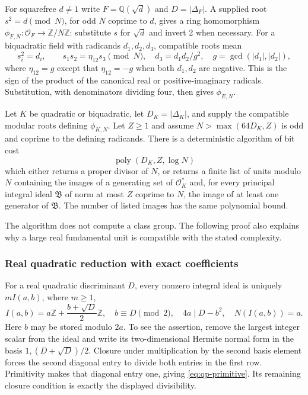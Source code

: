 For squarefree $d\ne1$ write $F=\mathbb Q(\sqrt d)$ and
$D=|\Delta_F|$.  A supplied root $s^2=d\pmod N$, for odd $N$ coprime to
$d$, gives a ring homomorphism
$\phi_{F,N}:\mathcal O_F\longrightarrow\mathbb Z/N\mathbb Z$:
substitute $s$ for $\sqrt d$ and invert 2 when necessary.  For a
biquadratic field with radicands $d_1,d_2,d_3$, compatible roots mean
\[
 s_i^2=d_i,\qquad s_1s_2=\eta_{12}s_3\pmod N,
 \quad d_3=d_1d_2/g^2,\quad g=\gcd(|d_1|,|d_2|),
\]
where $\eta_{12}=g$ except that $\eta_{12}=-g$ when both $d_1,d_2$ are
negative.  This is the sign of the product of the canonical real or
positive-imaginary radicals.  Substitution, with denominators dividing
four, then gives $\phi_{E,N}$.

\begin{theorem}
\label{thm:qp-enumeration}
Let $K$ be quadratic or biquadratic, let $D_K=|\Delta_K|$, and supply
the compatible modular roots defining $\phi_{K,N}$.  Let $Z\geq1$ and
assume $N>\max(64D_K,Z)$ is odd and coprime to the defining radicands.
There is a deterministic algorithm of bit cost
\[
 \operatorname{poly}(D_K,Z,\log N)
\]
which either returns a proper divisor of $N$, or returns a finite list of
units modulo $N$ containing the images of a generating set of
$\mathcal O_K^*$ and, for every principal integral ideal $\mathfrak B$ of
norm at most $Z$ coprime to $N$, the image of at least one generator of
$\mathfrak B$.  The number of listed images has the same polynomial bound.
\end{theorem}

The algorithm does not compute a class group.  The following proof also
explains why a large real fundamental unit is compatible with the stated
complexity.

\subsubsection{Real quadratic reduction with exact coefficients}

For a real quadratic discriminant $D$, every nonzero integral ideal is
uniquely $mI(a,b)$, where $m\geq1$,
\begin{equation}
 I(a,b)=a\mathbb Z+\frac{b+\sqrt D}{2}\mathbb Z,
 \quad b\equiv D\pmod2,\quad 4a\mid D-b^2,
 \quad N(I(a,b))=a.
 \label{eq:qp-primitive}
\end{equation}
Here $b$ may be stored modulo $2a$.  To see the assertion, remove the
largest integer scalar from the ideal and write its two-dimensional
Hermite normal form in the basis $1,(D+\sqrt D)/2$.  Closure under
multiplication by the second basis element forces the second diagonal
entry to divide both entries in the first row.  Primitivity makes that
diagonal entry one, giving \eqref{eq:qp-primitive}.  Its remaining closure
condition is exactly the displayed divisibility.

